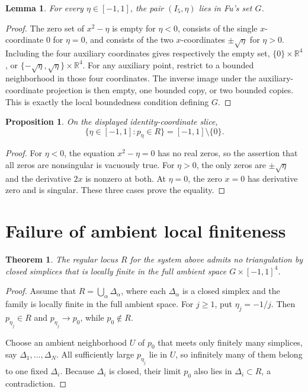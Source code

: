 \documentclass[11pt]{article}
\newtheorem{theorem}{Theorem}
\newtheorem{proposition}{Proposition}
\newtheorem{lemma}{Lemma}
\newcommand{\R}{\mathbb{R}}
\begin{document}
\begin{lemma}
For every $\eta\in[-1,1]$, the pair $(I_5,\eta)$ lies in Fu's set $G$.
\end{lemma}

\begin{proof}
The zero set of $x^2-\eta$ is empty for $\eta<0$, consists of the single
$x$-coordinate $0$ for $\eta=0$, and consists of the two $x$-coordinates
$\pm\sqrt\eta$ for $\eta>0$.  Including the four auxiliary coordinates gives
respectively the empty set, $\{0\}\times\R^4$, or
$\{-\sqrt\eta,\sqrt\eta\}\times\R^4$.  For any auxiliary point, restrict to a
bounded neighborhood in those four coordinates.  The inverse image under the
auxiliary-coordinate projection is then empty, one bounded copy, or two
bounded copies.  This is exactly the local boundedness condition defining
$G$.
\end{proof}

\begin{proposition}
On the displayed identity-coordinate slice,
\[
 \{\eta\in[-1,1]:p_\eta\in R\}=[-1,1]\setminus\{0\}.
\]
\end{proposition}

\begin{proof}
For $\eta<0$, the equation $x^2-\eta=0$ has no real zeros, so the assertion
that all zeros are nonsingular is vacuously true.  For $\eta>0$, the only
zeros are $\pm\sqrt\eta$ and the derivative $2x$ is nonzero at both.  At
$\eta=0$, the zero $x=0$ has derivative zero and is singular.  These three
cases prove the equality.
\end{proof}

\section{Failure of ambient local finiteness}

\begin{theorem}
The regular locus $R$ for the system above admits no triangulation by closed
simplices that is locally finite in the full ambient space
$G\times[-1,1]^4$.
\end{theorem}

\begin{proof}
Assume that $R=\bigcup_\alpha\Delta_\alpha$, where each $\Delta_\alpha$ is a
closed simplex and the family is locally finite in the full ambient space.
For $j\geq1$, put $\eta_j=-1/j$.  Then $p_{\eta_j}\in R$ and
$p_{\eta_j}\to p_0$, while $p_0\notin R$.

Choose an ambient neighborhood $U$ of $p_0$ that meets only finitely many
simplices, say $\Delta_1,\ldots,\Delta_N$.  All sufficiently large
$p_{\eta_j}$ lie in $U$, so infinitely many of them belong to one fixed
$\Delta_i$.  Because $\Delta_i$ is closed, their limit $p_0$ also lies in
$\Delta_i\subset R$, a contradiction.
\end{proof}
\end{document}
